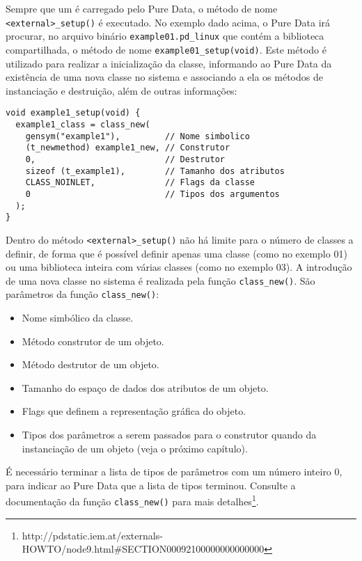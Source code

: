 Sempre que um \external é carregado pelo Pure Data, o método de nome
\texttt{<external>\_setup()} é executado. No exemplo dado acima, o Pure
Data irá procurar, no arquivo binário \texttt{example01.pd\_linux} que contém
a biblioteca compartilhada, o método de nome \texttt{example01\_setup(void)}.
Este método é utilizado para realizar a inicialização da classe, informando ao
Pure Data da existência de uma nova classe no sistema e associando a ela os
métodos de instanciação e destruição, além de outras informações:

\vspace{1em}
\begin{lstlisting}
void example1_setup(void) {
  example1_class = class_new(
    gensym("example1"),         // Nome simbolico
    (t_newmethod) example1_new, // Construtor
    0,                          // Destrutor
    sizeof (t_example1),        // Tamanho dos atributos
    CLASS_NOINLET,              // Flags da classe
    0                           // Tipos dos argumentos
  );
}
\end{lstlisting}

Dentro do método \texttt{<external>\_setup()} não há limite para o número de
classes a definir, de forma que é possível definir apenas uma classe (como no
exemplo 01) ou uma biblioteca inteira com várias classes (como no exemplo 03).
A introdução de uma nova classe no sistema é realizada pela função
\texttt{class\_new()}. São parâmetros da função \texttt{class\_new()}:

\begin{itemize}
\item Nome simbólico da classe.
\item Método construtor de um objeto.
\item Método destrutor de um objeto.
\item Tamanho do espaço de dados dos atributos de um objeto.
\item Flags que definem a representação gráfica do objeto.
\item Tipos dos parâmetros a serem passados para o construtor quando da
      instanciação de um objeto (veja o próximo capítulo).
\end{itemize}

É necessário terminar a lista de tipos de parâmetros com um número inteiro 0,
para indicar ao Pure Data que a lista de tipos terminou. Consulte a
documentação da função \texttt{class\_new()} para mais
detalhes\footnote{http://pdstatic.iem.at/externals-HOWTO/node9.html\#SECTION00092100000000000000}.

